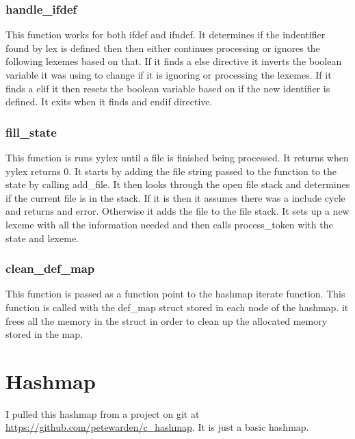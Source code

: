 \documentclass[11pt]{article}
\begin{document}
            \subsubsection{handle\_ifdef}
                This function works for both ifdef and ifndef. It determines if the indentifier found by lex is defined
                then then either continues processing or ignores the following lexemes based on that. If it finds
                a else  directive it inverts the boolean variable it was using to change if it is ignoring or processing 
                the lexemes. If it finds a elif it then resets the boolean variable based on if the new identifier is defined.
                It exits when it finds and endif directive.

            \subsubsection{fill\_state}
                This function is runs yylex until a file is finished being processed. It returns when yylex returns 0. 
                It starts by adding the file string passed to the function to the state by calling add\_file.
                It then looks through the open file stack and determines if the current file is in the stack.
                If it is then it assumes there was a include cycle and returns and error. Otherwise it adds the file
                to the file stack.
                It sets up a new lexeme with all the information needed and then calls process\_token with the state and lexeme.

            \subsubsection{clean\_def\_map}
                This function is passed as a function point to the hashmap iterate function.
                This function is called with the def\_map struct stored in each node of the hashmap.
                it frees all the memory in the struct in order to clean up the allocated memory stored in the map.

    \section{Hashmap}
        I pulled this hashmap from a project on git at \url{https://github.com/petewarden/c\_hashmap}.
        It is just a basic hashmap.
\end{document}
